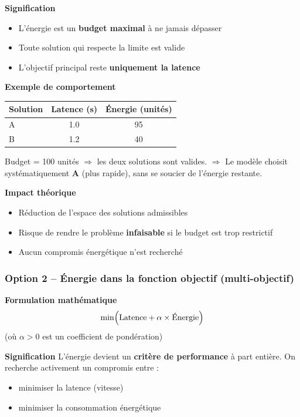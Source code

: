 \documentclass[a4paper,11pt]{article}
\begin{document}
\textbf{Signification}
\begin{itemize}[leftmargin=*]
    \item L’énergie est un \textbf{budget maximal} à ne jamais dépasser
    \item Toute solution qui respecte la limite est valide
    \item L’objectif principal reste \textbf{uniquement la latence}
\end{itemize}

\textbf{Exemple de comportement}
\begin{center}
\begin{tabular}{lcc}
\toprule
Solution & Latence (s) & Énergie (unités) \\
\midrule
A & 1.0 & 95 \\
B & 1.2 & 40 \\
\bottomrule
\end{tabular}
\end{center}

Budget = 100 unités $\Rightarrow$ les deux solutions sont valides.  
$\Rightarrow$ Le modèle choisit systématiquement \textbf{A} (plus rapide), sans se soucier de l’énergie restante.

\textbf{Impact théorique}
\begin{itemize}[leftmargin=*]
    \item Réduction de l’espace des solutions admissibles
    \item Risque de rendre le problème \textbf{infaisable} si le budget est trop restrictif
    \item Aucun compromis énergétique n’est recherché
\end{itemize}

\subsubsection{Option 2 – Énergie dans la fonction objectif (multi-objectif)}

\textbf{Formulation mathématique}
\[
\min \Bigl( \text{Latence} + \alpha \times \text{Énergie} \Bigr)
\]
(où $\alpha > 0$ est un coefficient de pondération)

\textbf{Signification}
L’énergie devient un \textbf{critère de performance} à part entière.  
On recherche activement un compromis entre :
\begin{itemize}[leftmargin=*]
    \item minimiser la latence (vitesse)
    \item minimiser la consommation énergétique
\end{itemize}
\end{document}
